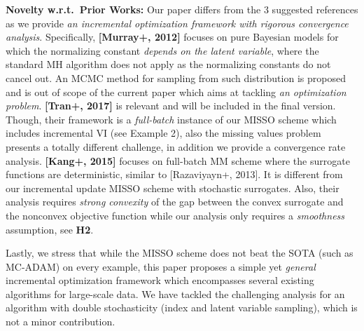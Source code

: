 \documentclass{article}
\begin{document}
\textbf{Novelty w.r.t.~Prior Works:} Our paper differs from the 3 suggested references as we provide \emph{an incremental optimization framework with rigorous convergence analysis}. Specifically, 
\textbf{[Murray+, 2012]} focuses on pure Bayesian models for which the normalizing constant \emph{depends on the latent variable}, where the standard MH algorithm does not apply as the normalizing constants do not cancel out. An MCMC method for sampling from such distribution is proposed and is out of scope of the current paper which aims at tackling \emph{an optimization problem}.
\textbf{[Tran+, 2017]} is relevant and will be included in the final version. 
Though, their framework is a \emph{full-batch} instance of our MISSO scheme which includes incremental VI (see Example 2), also the missing values problem presents a totally different challenge, in addition we provide a convergence rate analysis.
% 
\textbf{[Kang+, 2015]} focuses on full-batch MM scheme where the surrogate functions are deterministic, similar to [Razaviyayn+, 2013]. It is different from our incremental update MISSO scheme with stochastic surrogates.
Also, their analysis requires \emph{strong convexity} of the gap between the convex surrogate and the nonconvex objective function while our analysis only requires a \emph{smoothness} assumption, see \textbf{H2}.\vspace{-5pt}


Lastly, we stress  that while the MISSO scheme does not beat  the SOTA (such as MC-ADAM) on every example, this paper proposes a simple yet \emph{general} incremental optimization framework which encompasses several existing algorithms for large-scale data. 
We have tackled the challenging analysis for an algorithm with double stochasticity (index and latent variable sampling), which is not a minor contribution.
\end{document}
